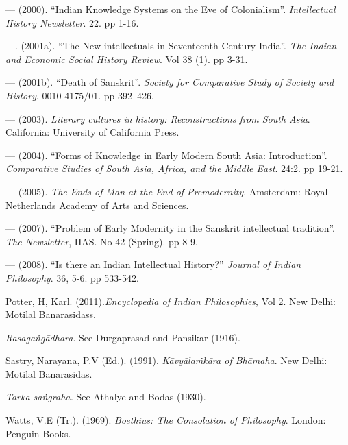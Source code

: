 \begin{thebibliography}{99}
 --- (2000). “Indian Knowledge Systems on the Eve of Colonialism”. {\sl Intellectual History Newsletter}. 22. pp 1-16.

 ---. (2001a). “The New intellectuals in Seventeenth Century India”. {\sl The Indian and Economic Social History Review}. Vol 38 (1). pp 3-31.

 --- (2001b). “Death of Sanskrit”. {\sl Society for Comparative Study of Society and History}. 0010-4175/01. pp 392–426. 

 --- (2003). {\sl Literary cultures in history: Reconstructions from South Asia}. California: University of California Press. 

 --- (2004). “Forms of Knowledge in Early Modern South Asia: Introduction”. {\sl Comparative Studies of South Asia, Africa, and the Middle East}. 24:2. pp 19-21.

 --- (2005). {\sl The Ends of Man at the End of Premodernity}. Amsterdam: Royal Netherlands Academy of Arts and Sciences. 

 --- (2007). “Problem of Early Modernity in the Sanskrit intellectual tradition”. {\sl The Newsletter}, IIAS. No 42 (Spring). pp 8-9. 

 --- (2008). “Is there an Indian Intellectual History?” {\sl Journal of Indian Philosophy}. 36, 5-6. pp 533-542.

 Potter, H, Karl. (2011).{\sl  Encyclopedia of Indian Philosophies}, Vol 2. New Delhi: Motilal Banarasidass. 

{\em Rasagaṅgādhara}. See Durgaprasad and Pansikar (1916).

 Sastry, Narayana, P.V (Ed.). (1991). {\sl Kāvyālaṁkāra of Bhāmaha}. New Delhi: Motilal Banarasidas. 

 {\sl Tarka-saṅgraha.} See Athalye and Bodas (1930).

 Watts, V.E (Tr.). (1969). {\sl Boethius: The Consolation of Philosophy}. London: Penguin Books. 
\end{thebibliography}

\theendnotes
\label{chapter\thechapter:end}
